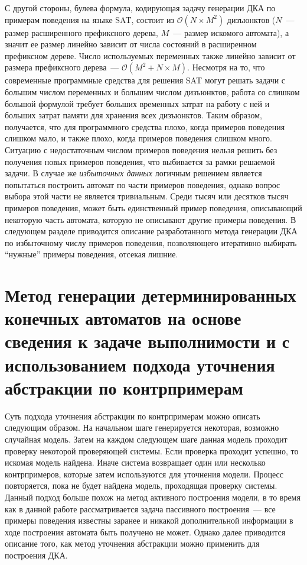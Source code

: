 С другой стороны, булева формула, кодирующая задачу генерации ДКА по примерам поведения на языке SAT, состоит из $\mathcal{O}\left(N \times M^2\right)$ дизъюнктов ($N$~--- размер расширенного префиксного дерева, $M$~--- размер искомого автомата), а значит ее размер линейно зависит от числа состояний в расширенном префиксном дереве.
Число используемых переменных также линейно зависит от размера префиксного дерева~--- $\mathcal{O}(M^2 + N \times M)$.
Несмотря на то, что современные программные средства для решения SAT могут решать задачи с большим числом переменных и большим числом дизъюнктов, работа со слишком большой формулой требует больших временных затрат на работу с ней и больших затрат памяти для хранения всех дизъюнктов.
Таким образом, получается, что для программного средства плохо, когда примеров поведения слишком мало, и также плохо, когда примеров поведения слишком много.
Ситуацию с недостаточным числом примеров поведения нельзя решить без получения новых примеров поведения, что выбивается за рамки решаемой задачи.
В случае же \emph{избыточных данных} логичным решением является попытаться построить автомат по части примеров поведения, однако вопрос выбора этой части не является тривиальным.
Среди тысяч или десятков тысяч примеров поведения, может быть единственный пример поведения, описывающий некоторую часть автомата, которую не описывают другие примеры поведения.
В следующем разделе приводится описание разработанного метода генерации ДКА по избыточному числу примеров поведения, позволяющего итеративно выбирать ``нужные'' примеры поведения, отсекая лишние.

\section{Метод генерации детерминированных конечных автоматов на основе сведения к задаче выполнимости и с использованием подхода уточнения абстракции по контрпримерам}
\label{sec:cegar:cegar-algo}

Суть подхода уточнения абстракции по контрпримерам можно описать следующим образом.
На начальном шаге генерируется некоторая, возможно случайная модель.
Затем на каждом следующем шаге данная модель проходит проверку некоторой проверяющей системы.
Если проверка проходит успешно, то искомая модель найдена.
Иначе система возвращает один или несколько контрпримеров, которые затем используются для уточнения модели.
Процесс повторяется, пока не будет найдена модель, проходящая проверку системы.
Данный подход больше похож на метод активного построения модели, в то время как в данной работе рассматривается задача пассивного построения~--- все примеры поведения известны заранее и никакой дополнительной информации в ходе построения автомата быть получено не может.
Однако далее приводится описание того, как метод уточнения абстракции можно применить для построения ДКА.

